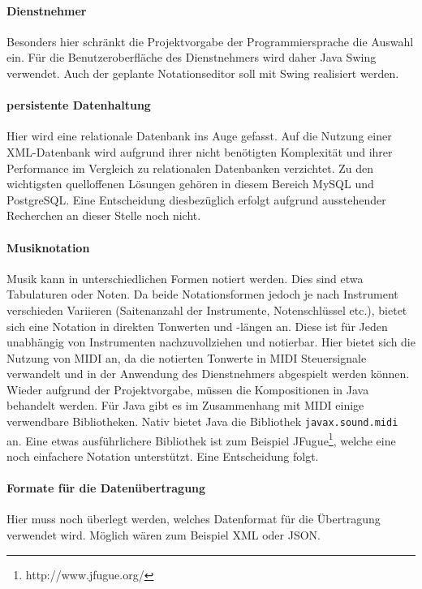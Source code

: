 \documentclass[12pt]{scrartcl}
\begin{document}

\paragraph*{Dienstnehmer}
Besonders hier schränkt die Projektvorgabe der Programmiersprache die Auswahl ein. Für die Benutzeroberfläche des Dienstnehmers wird daher Java Swing verwendet. Auch der geplante Notationseditor soll mit Swing realisiert werden.

\paragraph*{persistente Datenhaltung}
Hier wird eine relationale Datenbank ins Auge gefasst. Auf die Nutzung einer XML-Datenbank wird aufgrund ihrer nicht benötigten Komplexität und ihrer Performance im Vergleich zu relationalen Datenbanken verzichtet. Zu den wichtigsten quelloffenen Lösungen gehören in diesem Bereich MySQL und PostgreSQL. Eine Entscheidung diesbezüglich erfolgt aufgrund ausstehender Recherchen an dieser Stelle noch nicht.

\paragraph*{Musiknotation}
Musik kann in unterschiedlichen Formen notiert werden. Dies sind etwa Tabulaturen oder Noten. Da beide Notationsformen jedoch je nach Instrument verschieden Variieren (Saitenanzahl der Instrumente, Notenschlüssel etc.), bietet sich eine Notation in direkten Tonwerten und -längen an. Diese ist für Jeden unabhängig von Instrumenten nachzuvollziehen und notierbar. Hier bietet sich die Nutzung von MIDI an, da die notierten Tonwerte in MIDI Steuersignale verwandelt und in der Anwendung des Dienstnehmers abgespielt werden können. Wieder aufgrund der Projektvorgabe, müssen die Kompositionen in Java behandelt werden. Für Java gibt es im Zusammenhang mit MIDI einige verwendbare Bibliotheken. Nativ bietet Java die Bibliothek \texttt{javax.sound.midi} an. Eine etwas ausführlichere Bibliothek ist zum Beispiel JFugue\footnote{http://www.jfugue.org/}, welche eine noch einfachere Notation unterstützt. Eine Entscheidung folgt.

\paragraph*{Formate für die Datenübertragung}
Hier muss noch überlegt werden, welches Datenformat für die Übertragung verwendet wird. Möglich wären zum Beispiel XML oder JSON.
\end{document}

